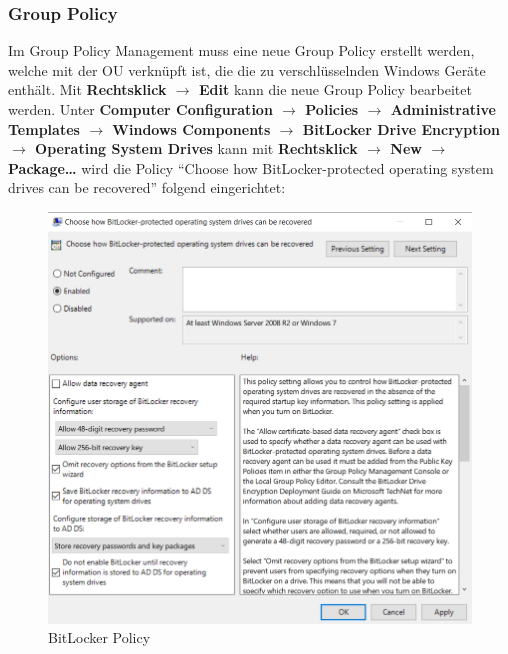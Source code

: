 \subsubsection{Group Policy}
Im Group Policy Management muss eine neue Group Policy erstellt werden, welche mit der OU verknüpft ist, die die zu verschlüsselnden Windows Geräte enthält.
Mit \textbf{Rechtsklick $\rightarrow$ Edit} kann die neue Group Policy bearbeitet werden.
Unter \textbf{Computer Configuration $\rightarrow$ Policies $\rightarrow$ Administrative Templates $\rightarrow$ Windows Components $\rightarrow$ BitLocker Drive Encryption $\rightarrow$ Operating System Drives} kann mit \textbf{Rechtsklick $\rightarrow$ New $\rightarrow$ Package\dots} wird die Policy ``Choose how BitLocker-protected operating system drives can be recovered'' folgend eingerichtet:
\begin{figure}[H]
    \centering
    \includegraphics[width=0.7\linewidth]{../img/Encryption/store-bitlocker-in-ad.png}
    \caption{BitLocker Policy}
\end{figure}

